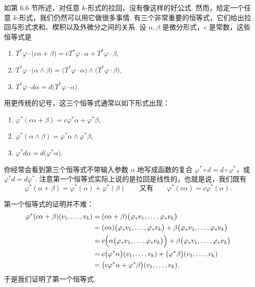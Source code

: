 如第 6.6 节所述，对任意 $k$-形式的拉回，没有像这样的好公式. 然而，给定一个任意 $k$-形式，我们仍然可以用它做很多事情. 有三个非常重要的恒等式，它们给出拉回与形式求和、楔积以及外微分之间的关系. 设 $\alpha,\beta$ 是微分形式，$c$ 是常数，这些恒等式是

\begin{theorem}[拉回恒等式]\label{thm:6-1}
\begin{enumerate}
  \item[(1)] $T^*\varphi\cdot\bigl(c\alpha+\beta\bigr)=cT^*\varphi\cdot\alpha+T^*\varphi\cdot\beta,$
  \item[(2)] $T^*\varphi\cdot\bigl(\alpha\wedge\beta\bigr)=\bigl(T^*\varphi\cdot\alpha\bigr)\wedge\bigl(T^*\varphi\cdot\beta\bigr),$
  \item[(3)] $T^*\varphi\cdot d\alpha=d\bigl(T^*\varphi\cdot\alpha\bigr).$
\end{enumerate}
\end{theorem}

用更传统的记号，这三个恒等式通常以如下形式出现：
\begin{enumerate}
  \item[(1)] $\varphi^*(c\alpha+\beta)=c\varphi^*\alpha+\varphi^*\beta,$
  \item[(2)] $\varphi^*(\alpha\wedge\beta)=\varphi^*\alpha\wedge\varphi^*\beta,$
  \item[(3)] $\varphi^*d\alpha=d\bigl(\varphi^*\alpha\bigr).$
\end{enumerate}
你经常会看到第三个恒等式不带输入参数 $\alpha$ 地写成函数的复合 $\varphi^*\circ d=d\circ\varphi^*$，或 $\varphi^*d=d\varphi^*$. 注意第一个恒等式实际上说的是拉回是线性的，也就是说，我们既有
\[
\varphi^*(\alpha+\beta)=\varphi^*(\alpha)+\varphi^*(\beta)\qquad\text{又有}\qquad\varphi^*(c\alpha)=c\varphi^*(\alpha).
\]

第一个恒等式的证明并不难：
\begin{align*}
\varphi^*(c\alpha+\beta)(v_1,\ldots,v_k)
&=(c\alpha+\beta)\bigl(\varphi_*v_1,\ldots,\varphi_*v_k\bigr)\\
&=(c\alpha)\bigl(\varphi_*v_1,\ldots,\varphi_*v_k\bigr)+\beta\bigl(\varphi_*v_1,\ldots,\varphi_*v_k\bigr)\\
&=c\Bigl(\alpha\bigl(\varphi_*v_1,\ldots,\varphi_*v_k\bigr)\Bigr)+\beta\bigl(\varphi_*v_1,\ldots,\varphi_*v_k\bigr)\\
&=c\bigl(\varphi^*\alpha\bigr)(v_1,\ldots,v_k)+\bigl(\varphi^*\beta\bigr)(v_1,\ldots,v_k)\\
&=\bigl(c\varphi^*\alpha+\varphi^*\beta\bigr)(v_1,\ldots,v_k).
\end{align*}
于是我们证明了第一个恒等式.

